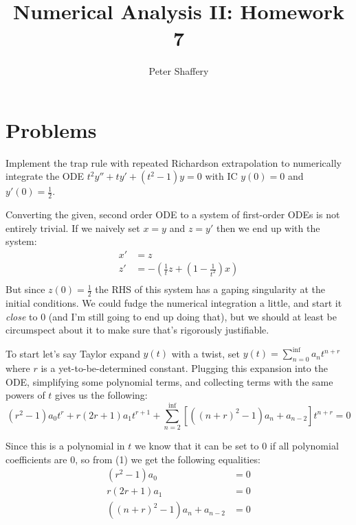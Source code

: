 \documentclass[10pt,a4paper]{article}
\newenvironment{problem}[2][Problem]{\begin{trivlist}
\item[\hskip \labelsep {\bfseries #1}\hskip \labelsep {\bfseries #2.}]}{\end{trivlist}}
\begin{document}
\author{Peter Shaffery}
\title{Numerical Analysis II: Homework 7}
\maketitle
\section{Problems}
\begin{problem}{1}
Implement the trap rule with repeated Richardson extrapolation to numerically integrate the ODE $t^2 y'' + t y' + (t^2 - 1) y = 0$ with IC $y(0) = 0$ and $y'(0) = \frac{1}{2}$.
\end{problem}
Converting the given, second order ODE to a system of first-order ODEs is not entirely trivial.  If we naively set $x = y$ and $z = y'$ then we end up with the system:
\[
\begin{split}
x' &= z\\
z' &= - \left( \frac{1}{t} z + \left( 1-\frac{1}{t^2} \right) x \right)\\
\end{split}
\]
But since $z(0) = \frac{1}{2}$ the RHS of this system has a gaping singularity at the initial conditions. We could fudge the numerical integration a little, and start it \textit{close} to 0 (and I'm still going to end up doing that), but we should at least be circumspect about it to make sure that's rigorously justifiable.

To start let's say Taylor expand $y(t)$ with a twist, set $y(t) = \sum\limits_{n=0}^{\inf} a_n t^{n+r}$ where $r$ is a yet-to-be-determined constant.  Plugging this expansion into the ODE, simplifying some polynomial terms, and collecting terms with the same powers of $t$ gives us the following:
\begin{equation}
(r^2-1)a_0 t^r + r(2r+1) a_1 t^{r+1} + \sum\limits_{n=2}^{\inf} \left[ \left( (n+r)^2-1 \right) a_n + a_{n-2} \right] t^{n+r} = 0
\end{equation}

Since this is a polynomial in $t$ we know that it can be set to $0$ if all polynomial coefficients are $0$, so from (1) we get the following equalities:
\begin{equation}
\begin{split}
(r^2 - 1) a_0 &= 0\\
r(2r+1) a_1 &= 0\\
\left( (n+r)^2-1 \right) a_n + a_{n-2} &= 0\\
\end{split}
\end{equation}
\end{document}
